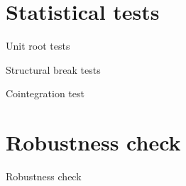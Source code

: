 \documentclass[10pt]{beamer}
\begin{document}
\section{Statistical tests}


\begin{frame}{Unit root tests}
\scriptsize{}
\end{frame}


\begin{frame}{Structural break tests}
\scriptsize{}
\end{frame}


\begin{frame}{Cointegration test}
\scriptsize{}
\end{frame}




\section{Robustness check}
\begin{frame}{Robustness check}
	     
\end{frame}
\end{document}

